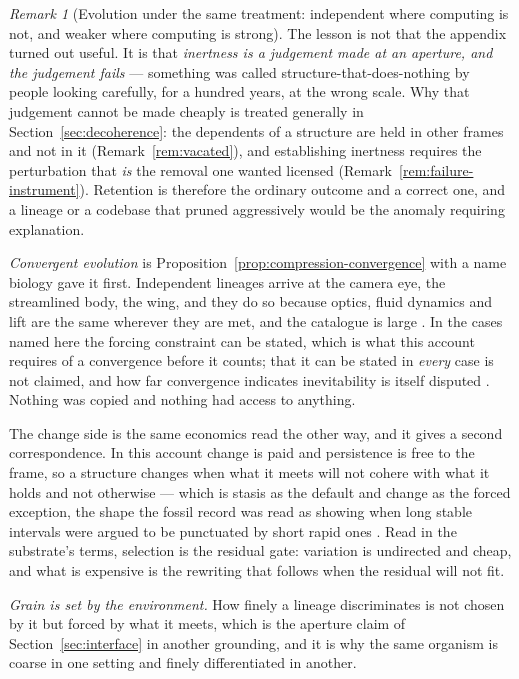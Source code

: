 \documentclass[11pt,a4paper]{article}
\theoremstyle{remark}\newtheorem{remark}[definition]{Remark}
\begin{document}
\begin{remark}[Evolution under the same treatment: independent where computing is not, and weaker where computing is strong]
The lesson is not that the appendix turned out useful. It is that \emph{inertness is a judgement made
at an aperture, and the judgement fails} --- something was called structure-that-does-nothing by people
looking carefully, for a hundred years, at the wrong scale. Why that judgement cannot be made cheaply
is treated generally in Section~\ref{sec:decoherence}: the dependents of a structure are held in other
frames and not in it (Remark~\ref{rem:vacated}), and establishing inertness requires the perturbation
that \emph{is} the removal one wanted licensed (Remark~\ref{rem:failure-instrument}). Retention is
therefore the ordinary outcome and a correct one, and a lineage or a codebase that pruned aggressively
would be the anomaly requiring explanation.

\emph{Convergent evolution} is Proposition~\ref{prop:compression-convergence} with a name biology gave
it first. Independent lineages arrive at the camera eye, the streamlined body, the wing, and they do
so because optics, fluid dynamics and lift are the same wherever they are met, and the catalogue is
large \citep{mcghee2011}. In the cases named here the forcing constraint can be stated, which is what
this account requires of a convergence before it counts; that it can be stated in \emph{every} case is
not claimed, and how far convergence indicates inevitability is itself disputed \citep{losos2017}.
Nothing was copied and nothing had access to anything.

The change side is the same economics read the other way, and it gives a second correspondence. In
this account change is paid and persistence is free to the frame, so a structure changes when what it meets will
not cohere with what it holds and not otherwise --- which is stasis as the default and change as the
forced exception, the shape the fossil record was read as showing when long stable intervals were
argued to be punctuated by short rapid ones \citep{eldredgegould1972}. Read in the substrate's terms,
selection is the residual gate: variation is undirected and cheap, and what is expensive is the
rewriting that follows when the residual will not fit.

\emph{Grain is set by the environment.} How finely a lineage discriminates is not chosen by it but
forced by what it meets, which is the aperture claim of Section~\ref{sec:interface} in another
grounding, and it is why the same organism is coarse in one setting and finely differentiated in
another.
\end{remark}
\end{document}
